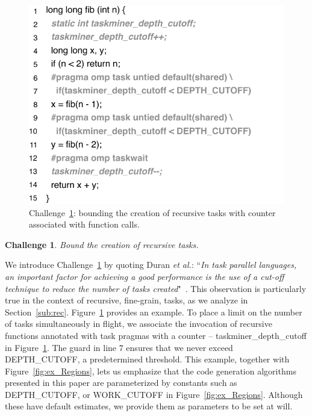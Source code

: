 \documentclass[sigplan,10pt,review,anonymous]{acmart}
\newtheorem{Challenge}{Challenge}[section]
\begin{document}
\begin{figure}[h!]
\begin{center}
\includegraphics[width=1\columnwidth]{images/ex_cutoff}
\caption{Challenge~\ref{ch:cutoff}: bounding the creation of recursive tasks with
counter associated with function calls.}
\label{fig:ex_cutoff}
\end{center}
\end{figure}

\begin{Challenge}
\label{ch:cutoff}
Bound the creation of recursive tasks.
\end{Challenge}

We introduce Challenge~\ref{ch:cutoff} by quoting Duran {\em et al.}:
``{\em In task parallel languages, an important factor for achieving a good
performance is the use of a cut-off technique to reduce the number of tasks
created}"~\cite{Duran08b}.
This observation is particularly true in the context of recursive, fine-grain,
tasks, as we analyze in Section~\ref{sub:rec}.
Figure~\ref{fig:ex_cutoff} provides an example.
To place a limit on the number of tasks simultaneously in flight, we associate
the invocation of recursive functions annotated with task pragmas with a
counter -- \textsf{taskminer\_depth\_cutoff} in Figure~\ref{fig:ex_cutoff}.
The guard in line 7 ensures that we never exceed \textsf{DEPTH\_CUTOFF}, a
predetermined threshold.
This example, together with Figure~\ref{fig:ex_Regions}, lets us emphasize that
the code generation algorithms presented in this paper are
parameterized by constants such as \textsf{DEPTH\_CUTOFF}, or
\textsf{WORK\_CUTOFF} in Figure~\ref{fig:ex_Regions}. Although these
have default estimates, we provide them as parameters to be set at will.
\end{document}
